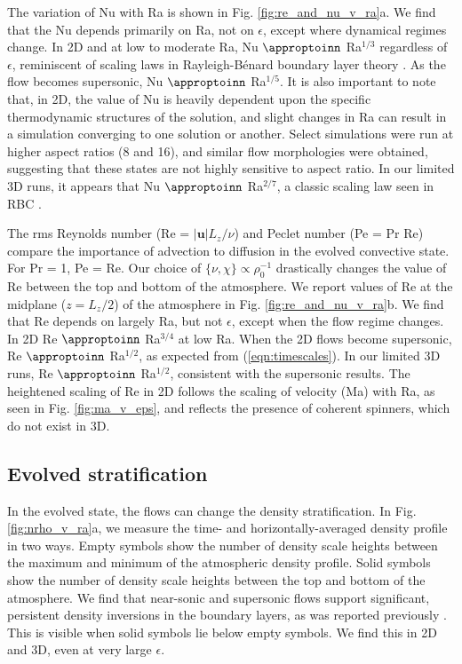 \documentclass[aps, prfluids, onecolumn, notitlepage, nofootinbib, groupedaddress, amsfonts, amssymb, amsmath]{revtex4-1}
\newcommand{\RB}{Rayleigh-B\'{e}nard }
\newcommand{\approptoinn}[2]{\mathrel{\vcenter{
	\offinterlineskip\halign{\hfil$##$\cr
	#1\propto\cr\noalign{\kern2pt}#1\sim\cr\noalign{\kern-2pt}}}}}
\newcommand{\appropto}{\mathpalette\approptoinn\relax}
\begin{document}
The variation of Nu with Ra is shown in 
Fig. \ref{fig:re_and_nu_v_ra}a.  We find that the Nu depends primarily
on Ra, not on $\epsilon$, except where dynamical regimes change.
In 2D and at low to moderate Ra, 
Nu $\appropto$ Ra$^{1/3}$ regardless of $\epsilon$,
reminiscent of scaling laws in \RB boundary layer theory 
\cite{grossman&lohse2000, ahlers&all2009, king&all2012}.
As the flow becomes supersonic,  Nu $\appropto$ Ra$^{1/5}$.
It is also important to note that, in 2D,
the value of Nu is heavily dependent upon the specific thermodynamic
structures of the solution, and slight changes in
Ra can result in a simulation converging to one solution or another. 
Select simulations were run at higher aspect ratios (8 and 16), and similar flow
morphologies were obtained, suggesting that these states are not highly
sensitive to aspect ratio.
In our limited 3D runs, it appears that Nu $\appropto$ Ra$^{2/7}$, a classic scaling law
seen in RBC \cite{johnston&doering2009}.

The rms Reynolds number (Re = $|\bm{u}|L_z/\nu$) and Peclet number
(Pe = Pr Re)
compare the importance of advection to diffusion in the evolved
convective state.  For Pr = 1, Pe = Re.  
Our choice of $\{\nu,\chi\}\propto \rho_0^{-1}$ drastically changes
the value of Re between the top and bottom of the atmosphere.  We report values of
Re at the midplane ($z=L_z/2$) of the atmosphere in
Fig. \ref{fig:re_and_nu_v_ra}b.  We find that Re
depends on largely Ra, but not $\epsilon$, except when the flow regime
changes.
In 2D Re $\appropto$ Ra$^{3/4}$ at low Ra.    When the 2D flows
become supersonic, 
Re $\appropto$ Ra$^{1/2}$, as expected
from (\ref{eqn:timescales}).
In our limited 3D runs,
Re $\appropto$ Ra$^{1/2}$, consistent with the supersonic results.
The heightened scaling
of Re in 2D follows the scaling of velocity (Ma) with Ra, as
seen in Fig. \ref{fig:ma_v_eps}, and reflects the presence of coherent
spinners, which do not exist in 3D.

\vspace{-0.5cm}
\subsection{Evolved stratification}

In the evolved state, the flows can change the density stratification.
In Fig. \ref{fig:nrho_v_ra}a, we measure the 
time- and horizontally-averaged density profile in two ways. Empty symbols
show the number of density scale heights between the maximum and minimum of the
atmospheric density profile.  Solid symbols
show the number of density scale heights between the top and bottom of the atmosphere. 
We find that near-sonic and supersonic flows support significant, 
persistent density inversions in the boundary layers, as
was reported previously \cite{brandenburg&all2005}.  This is visible when
solid symbols lie below empty symbols.  We find this in 2D and 3D, even
at very large $\epsilon$.  
\end{document}
